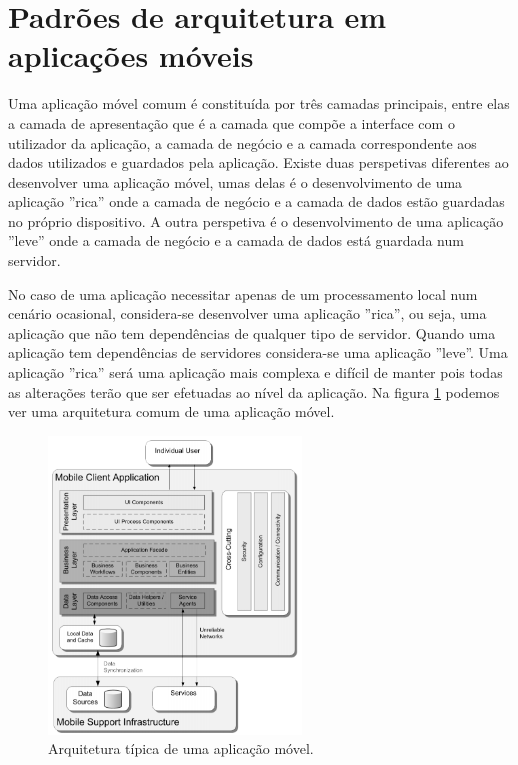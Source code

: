 \section{Padrões de arquitetura em aplicações móveis}
Uma aplicação móvel comum é constituída por três camadas principais, entre elas a camada de apresentação que é a camada que compõe a interface com o utilizador da aplicação, a camada de negócio e a camada correspondente aos dados utilizados e guardados pela aplicação. Existe duas perspetivas diferentes ao desenvolver uma aplicação móvel, umas delas é o desenvolvimento de uma aplicação ''rica'' onde a camada de negócio e a camada de dados estão guardadas no próprio dispositivo. A outra perspetiva é o desenvolvimento de uma aplicação ''leve'' onde a camada de negócio e a camada de dados está guardada num servidor. 
\par
No caso de uma aplicação necessitar apenas de um processamento local num cenário ocasional, considera-se desenvolver uma aplicação ''rica'', ou seja, uma aplicação que não tem dependências de qualquer tipo de servidor. Quando uma aplicação tem dependências de servidores considera-se uma aplicação ''leve''. Uma aplicação ''rica'' será uma aplicação mais complexa e difícil de manter pois todas as alterações terão que ser efetuadas ao nível da aplicação.
Na figura \ref{f:mobileapparch} podemos ver uma arquitetura comum de uma aplicação móvel. \cite{mobileappbook}

\begin{figure}[H]
  \centering
  \includegraphics[width=0.6\textwidth]{imgs/mobileapparch.png}
  \caption[Arquitetura t\'ipica de uma  aplica\c c\~ao móvel]{Arquitetura t\'ipica de uma  aplica\c c\~ao móvel. \cite{mobileappbook}}
  
  \label{f:mobileapparch}
\end{figure}

